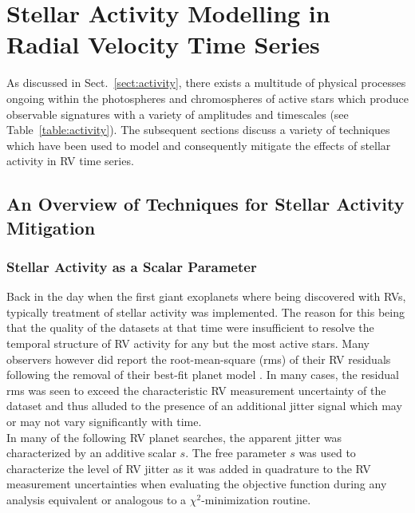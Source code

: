 \chapter{Stellar Activity Modelling in Radial Velocity Time Series}
As discussed in Sect.~\ref{sect:activity}, there exists a multitude of physical
processes ongoing within the photospheres and chromospheres of active stars
which produce observable signatures with a variety of amplitudes and timescales
(see Table~\ref{table:activity}). The subsequent sections discuss a variety of
techniques which have been used to model and consequently mitigate the effects of
stellar activity in RV time series.

\section{An Overview of Techniques for Stellar Activity Mitigation}
\label{sect:methods}

\subsection{Stellar Activity as a Scalar Parameter}
Back in the day when the first giant exoplanets where being discovered with RVs,
typically treatment of stellar activity was implemented. The reason for this being
that the quality of the datasets at that time were insufficient to resolve the
temporal structure of RV activity for any but the most active stars. Many
observers however did report the root-mean-square (rms) of their RV residuals
following the removal of their best-fit planet model
\citep[e.g.][]{mayor95,butler96}. In
many cases, the residual rms was seen to exceed the characteristic RV measurement
uncertainty of the dataset and thus alluded to the presence of an additional
jitter signal which may or may not vary significantly with time. \\

In many of the following RV planet searches, the apparent jitter was characterized
by an additive scalar $s$. The free parameter $s$ was used to characterize the
level of RV jitter as it was added in quadrature to the RV measurement
uncertainties when evaluating the objective function during any analysis
equivalent or analogous to a $\chi^2$-minimization routine. 


